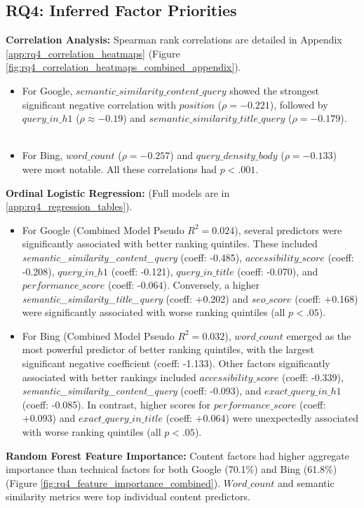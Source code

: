 \documentclass[a4paper,fleqn]{cas-sc}
\newcommand{\longvar}[1]{\textit{#1}}
\begin{document}
\subsection{RQ4: Inferred Factor Priorities}
\label{subsec:results_rq4}
\textbf{Correlation Analysis:} Spearman rank correlations are detailed in Appendix \ref{app:rq4_correlation_heatmaps} (Figure \ref{fig:rq4_correlation_heatmaps_combined_appendix}).
\begin{itemize}
    \item For Google, $\longvar{semantic_similarity_content_query}$ showed the strongest significant negative correlation with $position$ ($\rho = -0.221$), followed by $query\_in\_h1$ ($\rho \approx -0.19$) and $\longvar{semantic_similarity_title_query}$ ($\rho = -0.179$).
    \item For Bing, $word\_count$ ($\rho = -0.257$) and $query\_density\_body$ ($\rho = -0.133$) were most notable. All these correlations had $p < .001$.
\end{itemize}

\textbf{Ordinal Logistic Regression:} (Full models are in \ref{app:rq4_regression_tables}).
\begin{itemize}
    \item For Google (Combined Model Pseudo $R^2 = 0.024$), several predictors were significantly associated with better ranking quintiles. These included \longvar{semantic_similarity_content_query} (coeff: -0.485), $accessibility\_score$ (coeff: -0.208), $query\_in\_h1$ (coeff: -0.121), $query\_in\_title$ (coeff: -0.070), and $performance\_score$ (coeff: -0.064). Conversely, a higher \longvar{semantic_similarity_title_query} (coeff: +0.202) and $seo\_score$ (coeff: +0.168) were significantly associated with worse ranking quintiles (all $p < .05$).
    \item For Bing (Combined Model Pseudo $R^2 = 0.032$), $word\_count$ emerged as the most powerful predictor of better ranking quintiles, with the largest significant negative coefficient (coeff: -1.133). Other factors significantly associated with better rankings included $accessibility\_score$ (coeff: -0.339), \longvar{semantic_similarity_content_query} (coeff: -0.093), and $exact\_query\_in\_h1$ (coeff: -0.085). In contrast, higher scores for $performance\_score$ (coeff: +0.093) and $exact\_query\_in\_title$ (coeff: +0.064) were unexpectedly associated with worse ranking quintiles (all $p < .05$).
\end{itemize}

\textbf{Random Forest Feature Importance:} Content factors had higher aggregate importance than technical factors for both Google (70.1\%) and Bing (61.8\%) (Figure \ref{fig:rq4_feature_importance_combined}). $Word\_count$ and semantic similarity metrics were top individual content predictors.
\end{document}
